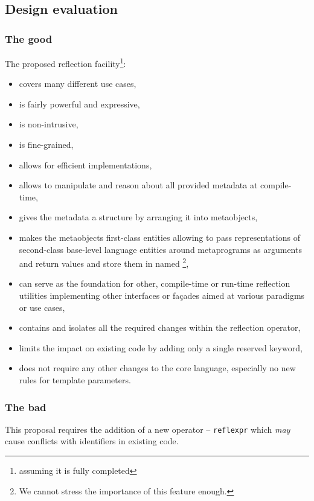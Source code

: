 \subsection{Design evaluation}

\subsubsection{The good}

The proposed reflection facility\footnote{assuming it is fully completed}:

\begin{itemize}
\item covers many different use cases,
\item is fairly powerful and expressive,
\item is non-intrusive,
\item is fine-grained,
\item allows for efficient implementations,
\item allows to manipulate and reason about all provided metadata at compile-time,
\item gives the metadata a structure by arranging it into metaobjects,
\item makes the metaobjects first-class entities allowing to pass
	representations of second-class base-level language entities
	around metaprograms as arguments and return values and store them
	in named \footnote{We cannot stress the importance of this
	feature enough.},
\item can serve as the foundation for other, compile-time or run-time reflection
	utilities implementing other interfaces or fa\c{c}ades aimed at various
	paradigms or use cases,
\item contains and isolates all the required changes within the reflection operator,
\item limits the impact on existing code by adding only a single reserved keyword,
\item does not require any other changes to the core language, especially no new rules
	for template parameters.
\end{itemize}

\subsubsection{The bad}

This proposal requires the addition of a new operator -- \texttt{reflexpr}
which {\em may} cause conflicts with identifiers in existing code.

